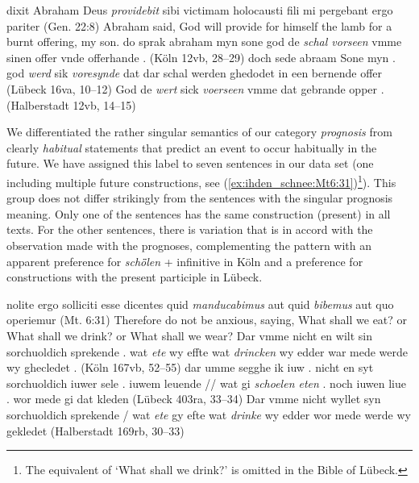 \documentclass[output=paper,colorlinks,citecolor=brown]{langscibook}
\begin{document}
\ea dixit Abraham Deus \textit{providebit} sibi victimam holocausti fili mi pergebant ergo pariter (Gen. 22:8)\label{ex:ihden_schnee:Gen22:8}
\exi{} Abraham said, God will provide for himself the lamb for a burnt offering, my son. 
\ea do sprak abraham myn sone god de \textit{schal vorseen} vmme sinen offer vnde offerhande . (Köln 12vb, 28--29)\label{ex:ihden_schnee:Gen22:8KLN}
\ex doch sede abraam Sone myn . god \textit{werd} sik \textit{voresynde} dat dar schal werden ghedodet in een bernende offer (Lübeck 16va, 10--12)\label{ex:ihden_schnee:Gen22:8LBK}
\ex God de \textit{wert} sick \textit{voerseen} vmme dat gebrande opper . (Halberstadt 12vb, 14--15)\label{ex:ihden_schnee:Gen22:8HBS}
\z
\z

We differentiated the rather singular semantics of our category \textit{prognosis} from clearly \textit{habitual} statements that predict an event to occur habitually in the future. We have assigned this label to seven sentences in our data set (one including multiple future constructions, see (\ref{ex:ihden_schnee:Mt6:31})\footnote{The equivalent of `What shall we drink?' is omitted in the Bible of Lübeck.}). This group does not differ strikingly from the sentences with the singular prognosis meaning. Only one of the sentences has the same construction (present) in all texts. For the other sentences, there is variation that is in accord with the observation made with the prognoses, complementing the pattern with an apparent preference for \textit{schȫlen} + infinitive in Köln and a preference for constructions with the present participle in Lübeck.

\ea nolite ergo solliciti esse dicentes quid \textit{manducabimus} aut quid \textit{bibemus} aut quo operiemur (Mt. 6:31)\label{ex:ihden_schnee:Mt6:31}
\exi{} Therefore do not be anxious, saying, What shall we eat? or What shall we drink? or What shall we wear?
\ea Dar vmme nicht en wilt sin sorchuoldich sprekende . wat \textit{ete} wy effte wat \textit{drincken} wy edder war mede werde wy ghecledet . (Köln 167vb, 52--55)
\ex dar umme segghe ik iuw . nicht en syt sorchuoldich iuwer sele . iuwem leuende // wat gi \textit{schoelen eten} . noch iuwen liue . wor mede gi dat kleden (Lübeck 403ra, 33--34)
\ex Dar vmme nicht wyllet syn sorchuoldich sprekende / wat \textit{ete} gy efte wat \textit{drinke} wy edder wor mede werde wy gekledet (Halberstadt 169rb, 30--33)
\z
\z
\end{document}
